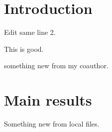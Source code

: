 \documentclass{article}
\begin{document}
\section{Introduction}%
\label{sec:introduction}


Edit same line 2. 


This is good. 

something new from my coauthor. 




\section{Main results}%
\label{sec:main_results}

Something new from local files. 
\end{document}
